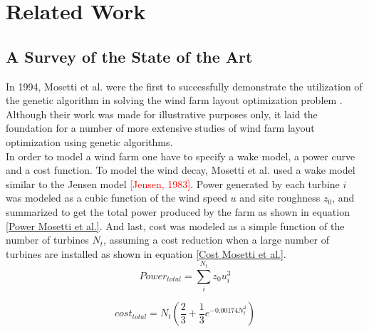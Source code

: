 \chapter{Related Work}


\section{A Survey of the State of the Art}




In 1994, Mosetti et al. were the first to successfully demonstrate the utilization of the genetic algorithm in solving the wind farm layout optimization problem {\citep{Mosetti}}. Although their work was made for illustrative purposes only, it laid the foundation for a number of more extensive studies of wind farm layout optimization using genetic algorithms.\\

\noindent In order to model a wind farm one have to specify a wake model, a power curve and a cost function. To model the wind decay, Mosetti et al. used a wake model similar to the Jensen model \textcolor{red}{[Jensen, 1983]}. Power generated by each turbine $i$ was modeled as a cubic function of the wind speed $u$ and site roughness $z_0$, and summarized to get the total power produced by the farm as shown in equation \ref{Power Mosetti et al.}. And last, cost was modeled as a simple function of the number of turbines $N_t$, assuming a cost reduction when a large number of turbines are installed as shown in equation \ref{Cost Mosetti et al.}. \\


\begin{equation}
\label{Power Mosetti et al.}
Power_{total} = \sum^{N_t}_{i} z_0u_i^3
\end{equation}


\begin{equation}
\label{Cost Mosetti et al.}
cost_{total} = N_t \left( \frac{2}{3} + \frac{1}{3}e^{-0.00174N_t^2} \right)
\end{equation}





